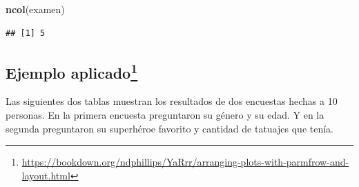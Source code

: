 \documentclass[
]{book}
\newenvironment{Shaded}{\begin{snugshade}}{\end{snugshade}}
\newcommand{\FunctionTok}[1]{\textcolor[rgb]{0.13,0.29,0.53}{\textbf{#1}}}
\newcommand{\NormalTok}[1]{#1}
\begin{document}
\begin{Shaded}
\begin{Highlighting}[]
\FunctionTok{ncol}\NormalTok{(examen)}
\end{Highlighting}
\end{Shaded}

\begin{verbatim}
## [1] 5
\end{verbatim}

\newpage

\subsection[Ejemplo aplicado]{\texorpdfstring{Ejemplo aplicado\footnote{\url{https://bookdown.org/ndphillips/YaRrr/arranging-plots-with-parmfrow-and-layout.html}}}{Ejemplo aplicado}}\label{ejemplo-aplicado1}

Las siguientes dos tablas muestran los resultados de dos encuestas hechas a 10 personas.
En la primera encuesta preguntaron su género y su edad.
Y en la segunda preguntaron su superhéroe favorito y cantidad de tatuajes que tenía.
\end{document}
